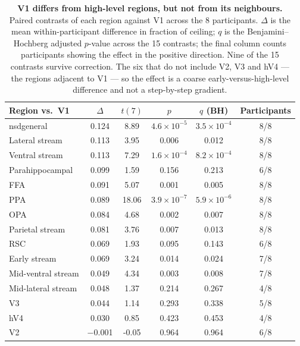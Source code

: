 \documentclass[11pt,a4paper]{article}
\begin{document}
\begin{table}[tb]
\centering
\caption{\textbf{V1 differs from high-level regions, but not from its
neighbours.} Paired contrasts of each region against V1 across the 8
participants. $\Delta$ is the mean within-participant difference in fraction of
ceiling; $q$ is the Benjamini--Hochberg adjusted $p$-value across the 15
contrasts; the final column counts participants showing the effect in the
positive direction. Nine of the 15 contrasts survive correction. The six that do
not include V2, V3 and hV4 --- the regions adjacent to V1 --- so the effect is a
coarse early-versus-high-level difference and not a step-by-step gradient.}
\label{tab:contrast}
\small
\begin{tabular}{lccccc}
\toprule
Region vs.\ V1 & $\Delta$ & $t(7)$ & $p$ & $q$ (BH) & Participants \\
\midrule
nsdgeneral          & \num{0.124} & 8.89 & $4.6\times10^{-5}$ & $3.5\times10^{-4}$ & 8/8 \\
Lateral stream      & \num{0.113} & 3.95 & 0.006 & 0.012 & 8/8 \\
Ventral stream      & \num{0.113} & 7.29 & $1.6\times10^{-4}$ & $8.2\times10^{-4}$ & 8/8 \\
Parahippocampal     & \num{0.099} & 1.59 & 0.156 & 0.213 & 6/8 \\
FFA                 & \num{0.091} & 5.07 & 0.001 & 0.005 & 8/8 \\
PPA                 & \num{0.089} & 18.06 & $3.9\times10^{-7}$ & $5.9\times10^{-6}$ & 8/8 \\
OPA                 & \num{0.084} & 4.68 & 0.002 & 0.007 & 8/8 \\
Parietal stream     & \num{0.081} & 3.76 & 0.007 & 0.013 & 8/8 \\
RSC                 & \num{0.069} & 1.93 & 0.095 & 0.143 & 6/8 \\
Early stream        & \num{0.069} & 3.24 & 0.014 & 0.024 & 7/8 \\
Mid-ventral stream  & \num{0.049} & 4.34 & 0.003 & 0.008 & 7/8 \\
Mid-lateral stream  & \num{0.048} & 1.37 & 0.214 & 0.267 & 4/8 \\
V3                  & \num{0.044} & 1.14 & 0.293 & 0.338 & 5/8 \\
hV4                 & \num{0.030} & 0.85 & 0.423 & 0.453 & 4/8 \\
V2                  & \num{-0.001} & -0.05 & 0.964 & 0.964 & 6/8 \\
\bottomrule
\end{tabular}
\end{table}
\end{document}
